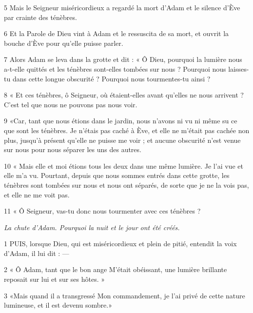 \par 5 Mais le Seigneur miséricordieux a regardé la mort d'Adam et le silence d'Ève par crainte des ténèbres.

\par 6 Et la Parole de Dieu vint à Adam et le ressuscita de sa mort, et ouvrit la bouche d'Ève pour qu'elle puisse parler.

\par 7 Alors Adam se leva dans la grotte et dit : « Ô Dieu, pourquoi la lumière nous a-t-elle quittés et les ténèbres sont-elles tombées sur nous ? Pourquoi nous laisses-tu dans cette longue obscurité ? Pourquoi nous tourmentes-tu ainsi ?

\par 8 « Et ces ténèbres, ô Seigneur, où étaient-elles avant qu'elles ne nous arrivent ? C’est tel que nous ne pouvons pas nous voir.

\par 9 «Car, tant que nous étions dans le jardin, nous n'avons ni vu ni même su ce que sont les ténèbres. Je n'étais pas caché à Ève, et elle ne m'était pas cachée non plus, jusqu'à présent qu'elle ne puisse me voir ; et aucune obscurité n’est venue sur nous pour nous séparer les uns des autres.

\par 10 « Mais elle et moi étions tous les deux dans une même lumière. Je l'ai vue et elle m'a vu. Pourtant, depuis que nous sommes entrés dans cette grotte, les ténèbres sont tombées sur nous et nous ont séparés, de sorte que je ne la vois pas, et elle ne me voit pas.

\par 11 « Ô Seigneur, vas-tu donc nous tourmenter avec ces ténèbres ?


\par \textit{La chute d'Adam. Pourquoi la nuit et le jour ont été créés.}

\par 1 PUIS, lorsque Dieu, qui est miséricordieux et plein de pitié, entendit la voix d'Adam, il lui dit : —

\par 2 « Ô Adam, tant que le bon ange M'était obéissant, une lumière brillante reposait sur lui et sur ses hôtes. »

\par 3 «Mais quand il a transgressé Mon commandement, je l'ai privé de cette nature lumineuse, et il est devenu sombre.»


